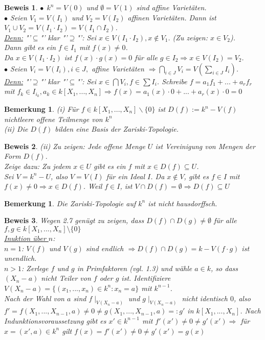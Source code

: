 \documentclass[a4paper,12pt]{report}
\theoremstyle{break}
\newtheorem{Bem}[Def]{Bemerkung}
\theoremstyle{nonumberbreak}
\theoremstyle{nonumberplain}
\newtheorem{Bew}{Beweis}
\begin{document}
\begin{Bew}
$\bullet~~ k^n=V(0)$ und $\emptyset = V(1)$ sind affine Varietäten.\\
$\bullet$ Seien $V_1=V(I_1)$ und $V_2=V(I_2)$ affinen Varietäten. Dann ist $V_1\cup V_2=V(I_1\cdot I_2)=V(I_1\cap I_2)$.\\
\underline{Denn:} "'$\subseteq$"' klar "'$\supseteq$"': Sei $x\in V(I_1\cdot I_2), x\notin V_1$. (Zu zeigen: $x\in V_2$).\\
Dann gibt es ein $f\in I_1$ mit $f(x) \neq 0$.\\
Da $x\in V(I_1\cdot I_2)$ ist $f(x)\cdot g(x)=0$ für alle $g\in I_2 \Rightarrow x\in V(I_2) = V_2$.\\
$\bullet$ Seien $V_i = V(I_i), i\in J,$ affine Varietäten $\Rightarrow \bigcap_{i\in J}V_i = V(\sum_{i\in J}I_i)$.\\
\underline{Denn:} "'$\supseteq$"' klar "'$\subseteq$"': Sei $x\in\bigcap V_i, f\in \sum I_i$. Schreibe $f=a_1f_1+...+a_rf_r$ mit $f_k\in I_{i_k}, a_k \in k[X_1,...,X_n] \Rightarrow f(x)=a_1(x) \cdot 0 +...+ a_r(x)\cdot 0 = 0$
\end{Bew}
\begin{Bem}
\label{bem:2.7}
(i) Für $f\in k[X_1,...,X_n]\backslash \{0\}$ ist $D(f):= k^n-V(f)$ nichtleere offene Teilmenge von $k^n$\\ 
(ii) Die $D(f)$ bilden eine Basis der Zariski-Topologie. 
\end{Bem}
\begin{Bew}
(ii) Zu zeigen: Jede offene Menge $U$ ist Vereinigung von Mengen der Form $D(f)$.\\
Zeige dazu: Zu jedem  $x\in U$ gibt es ein $f$ mit $x\in D(f)\subseteq U$.\\
Sei $V=k^n-U$, also $V=V(I)$ für ein Ideal $I$. Da $x\notin V$, gibt es $f\in I$
mit $f(x)\neq 0 \Rightarrow x\in D(f)$. Weil $f\in I$, ist $V\cap D(f) = \emptyset \Rightarrow D(f) \subseteq U$
\end{Bew}
\begin{Bem}
\label{bem:2.8}
Die Zariski-Topologie auf $k^n$ ist nicht hausdorffsch.
\end{Bem}

\begin{Bew} Wegen 2.7 genügt zu zeigen, dass $D(f)\cap D(g)\neq \emptyset$ für alle $f,g \in k[X_1,...,X_n]\setminus\{0\}$\\
\underline{Inuktion über $n$}:~\\
\underline{$n=1$}: $V(f)$ und $V(g)$ sind endlich $\Rightarrow D(f)\cap D(g)=k-V(f\cdot g)$ ist unendlich.\\
\underline{$n>1$}:  Zerlege $f$ und $g$ in Primfaktoren (vgl. 1.3) und wähle $a\in k$, so dass $(X_n-a)$ nicht Teiler von $f$ oder $g$ ist. Identifiziere $V(X_n-a)= \{(x_1,...,x_n)\in k^n: x_n=a\}$ mit $k^{n-1}$.\\
Nach der Wahl von $a$ sind $f\mid_{V(X_n-a)}$ und $g\mid_{V(X_n-a)}$ nicht identisch $0$, also $f'=f(X_1,...,X_{n-1},a) \neq 0 \neq g(X_1,...,X_{n-1},a)=:g'$ in $k[X_1,...,X_n]$. Nach Indunktionsvoraussetzung gibt es $x'\in k^{n-1}$ mit $f'(x')\neq 0\neq g'(x')\Rightarrow$ für $x=(x',a)\in k^n$ gilt $f(x)=f'(x')\neq 0 \neq g'(x')=g(x)$
\end{Bew}
\end{document}
